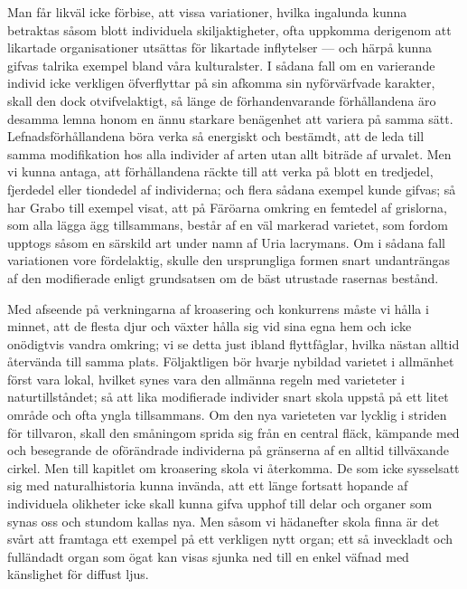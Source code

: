 Man får likväl icke förbise, att vissa variationer, hvilka ingalunda kunna betraktas såsom blott individuela skiljaktigheter, ofta uppkomma derigenom att likartade organisationer utsättas för likartade inflytelser — och härpå kunna gifvas talrika exempel bland våra kulturalster. I sådana fall om en varierande individ icke verkligen öfverflyttar på sin afkomma sin nyförvärfvade karakter, skall den dock otvifvelaktigt, så länge de förhandenvarande förhållandena äro desamma lemna honom en ännu starkare benägenhet att variera på samma sätt. Lefnadsförhållandena böra verka så energiskt och bestämdt, att de leda till samma modifikation hos alla individer af arten utan allt biträde af urvalet. Men vi kunna antaga, att förhållandena räckte till att verka på blott en tredjedel, fjerdedel eller tiondedel af individerna; och flera sådana exempel kunde gifvas; så har Grabo till exempel visat, att på Färöarna omkring en femtedel af grislorna, som alla lägga ägg tillsammans, består af en väl markerad varietet, som fordom upptogs såsom en särskild art under namn af Uria lacrymans. Om i sådana fall variationen vore fördelaktig, skulle den ursprungliga formen snart undanträngas af den modifierade enligt grundsatsen om de bäst utrustade rasernas bestånd.

Med afseende på verkningarna af kroasering och konkurrens måste vi hålla i minnet, att de flesta djur och växter hålla sig vid sina egna hem och icke onödigtvis vandra omkring; vi se detta just ibland flyttfåglar, hvilka nästan alltid återvända till samma plats. Följaktligen bör hvarje nybildad varietet i allmänhet först vara lokal, hvilket synes vara den allmänna regeln med varieteter i naturtillståndet; så att lika modifierade individer snart skola uppstå på ett litet område och ofta yngla tillsammans. Om den nya varieteten var lycklig i striden för tillvaron, skall den småningom sprida sig från en central fläck, kämpande med och besegrande de oförändrade individerna på gränserna af en alltid tillväxande cirkel. Men till kapitlet om kroasering skola vi återkomma. De som icke sysselsatt sig med naturalhistoria kunna invända, att ett länge fortsatt hopande af individuela olikheter icke skall kunna gifva upphof till delar och organer som synas oss och stundom kallas nya. Men såsom vi hädanefter skola finna är det svårt att framtaga ett exempel på ett verkligen nytt organ; ett så inveckladt och fulländadt organ som ögat kan visas sjunka ned till en enkel väfnad med känslighet för diffust ljus.

